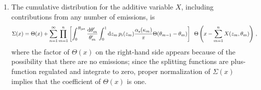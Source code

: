 
\begin{enumerate}[label=\alph*)]
    \item
    The cumulative distribution for the additive variable \(X\), including contributions from any number of emissions, is
    \begin{align}
        \Sigma(x)
        &=
        \Theta(x)
        +
        \sum_{n = 1}^\infty \prod_{m = 1}^n
        \left[
            \int_0^{R_\text{jet}} \frac{\dd\theta'_m}{\theta'_m}
            \int_0^1 \dd z_m \, p_i(z_m)
            \frac{\alpha_{\mathrm{s}}(\kappa_m)}{\pi}
            \Theta(\theta_{m-1} - \theta_m)
        \right]
        \,\,\,
        \Theta\left(x - \sum_{m=1}^n X(z_m, \theta_m)\right)
        \,,
    \end{align}
    where the factor of \(\Theta(x)\) on the right-hand side appears because of the possibility that there are no emissions;
    since the splitting functions are plus-function regulated and integrate to zero, proper normalization of \(\Sigma(x)\) implies that the coefficient of \(\Theta(x)\) is one.


\end{enumerate}
